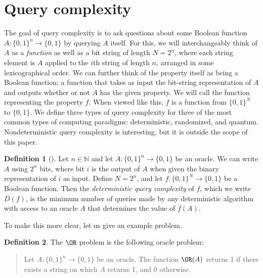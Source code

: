\documentclass[english,12pt]{reedthesis}
\theoremstyle{plain}
\theoremstyle{definition}
\newtheorem{defn}[defn]{Definition}
\theoremstyle{remark}
\begin{document}
\section{Query complexity}\label{sec:query-complexity}

The goal of query complexity is to ask questions about some Boolean function
$A\colon \{0, 1\}^{n} \rightarrow \{0, 1\}$ by querying $A$ itself. For this, we will
interchangeably think of $A$ as a \emph{function} as well as a bit string of
length $N = 2^{n}$, where each string element is $A$ applied to the $i$th string
of length $n$, arranged in some lexicographical
order. %
We can further think of the property itself as being a Boolean function; a
function that takes as input the bit-string representation of $A$ and outputs
whether or not $A$ has the given property. We will call the function
representing the property $f$. When viewed like this, $f$ is a function from
$\{0, 1\}^{N}$ to $\{0, 1\}$. We define three types of query complexity for
three of the most common types of computing paradigms: deterministic,
randomized, and quantum. Nondeterministic query complexity is interesting, but
it is outside the scope of this paper.

\begin{defn}[{\cite[17]{AW09}}]\label{def:det-qc}
  Let $n \in \mathbb{N}$ and let $A: \{0, 1\}^{n} \rightarrow \{0, 1\}$ be an oracle. We can write
  $A$ using $2^{n}$ bits, where bit $i$ is the output of $A$ when given the
  binary representation of $i$ as input. Define $N = 2^{n}$, and let
  $f\colon \{0, 1\}^{N} \rightarrow \{0, 1\}$ be a Boolean function. Then the
  \emph{deterministic query complexity} of $f$, which we write $D(f)$, is the
  minimum number of queries made by any deterministic algorithm with access to
  an oracle $A$ that determines the value of $f(A)$.
\end{defn}

To make this more clear, let us give an example problem.

\begin{defn}\label{def:or-problem}
  The $\OR$ problem is the following oracle problem:
  \begin{quote}
    Let $A\colon \{0, 1\}^{n} \rightarrow \{0, 1\}$ be an oracle. The function $\OR(A)$
    returns 1 if there exists a string on which $A$ returns 1, and $0$
    otherwise.
  \end{quote}
\end{defn}
\end{document}

